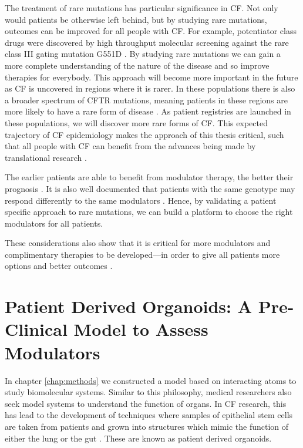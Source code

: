 The treatment of rare mutations has particular significance in CF. Not only would patients be otherwise left behind, but by studying rare mutations, outcomes can be improved for all people with CF. For example, potentiator class drugs were discovered by high throughput molecular screening against the rare class III gating mutation G551D \cite{vangoor2009}. By studying rare mutations we can gain a more complete understanding of the nature of the disease and so improve therapies for everybody. This approach will become more important in the future as CF is uncovered in regions where it is rarer. In these populations there is also a broader spectrum of CFTR mutations, meaning patients in these regions are more likely to have a rare form of disease \cite{singh2015,zheng2017,ni2022}. As patient registries are launched in these populations, we will discover more rare forms of CF. This expected trajectory of CF epidemiology makes the approach of this thesis critical, such that all people with CF can benefit from the advances being made by translational research \cite{zheng2017, garcia2022}. 



The earlier patients are able to benefit from modulator therapy, the better their prognosis \cite{zahav2022, lahiri2022}. It is also well documented that patients with the same genotype may respond differently to the same modulators \cite{hanafin2021}. Hence, by validating a patient specific approach to rare mutations, we can build a platform to choose the right modulators for all patients. 

These considerations also show that it is critical for more modulators and complimentary therapies to be developed---in order to give all patients more options and better outcomes \cite{hanafin2021}.

\section{Patient Derived Organoids: A Pre-Clinical Model to Assess Modulators}
In chapter \ref{chap:methods} we constructed a model based on interacting atoms to study biomolecular systems. Similar to this philosophy, medical researchers also seek model systems to understand the function of organs. In CF research, this has lead to the development of techniques where samples of epithelial stem cells are taken from patients and grown into structures which mimic the function of either the lung or the gut \cite{wong2015,depoel2020}. These are known as patient derived organoids.


